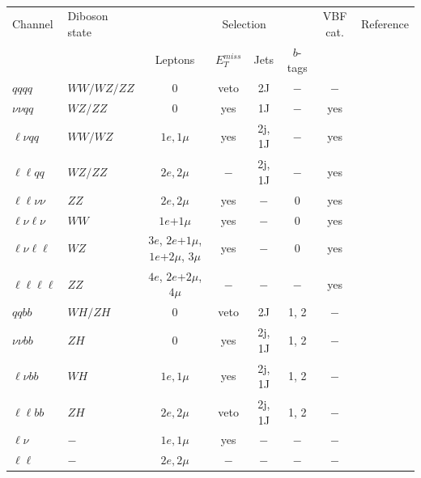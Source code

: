 \begin{table}[t]
	\caption{}
	\begin{center}
		\begin{tabular}{l l c c c c c c}
			\hline
			Channel            & Diboson state & \multicolumn{4}{c}{~~~~~~Selection}       & VBF cat. & Reference \\
			&               & Leptons       & $E^{miss}_T$  & Jets   & $b$-tags &          &           \\
			\hline
			$qq qq$            & $WW/WZ/ZZ$    & 0             & veto  & 2J     & $-$      & $-$      & \cite{EXOT-2016-19} \\
			$\nu\nu qq$        & $WZ/ZZ$       & 0             & yes   & 1J     & $-$      & yes      & \cite{EXOT-2016-29} \\
			$\ell\nu qq$       & $WW/WZ$       & $1e, 1\mu$    & yes   & 2j, 1J & $-$      & yes      & \cite{EXOT-2016-28} \\
			$\ell\ell qq$      & $WZ/ZZ$       & $2e, 2\mu$    & $-$   & 2j, 1J & $-$      & yes      & \cite{EXOT-2016-29} \\
			$\ell\ell\nu\nu$   & $ZZ$          & $2e, 2\mu$    & yes   & $-$    & 0        & yes      & \cite{HIGG-2016-19} \\
			$\ell\nu\ell\nu$   & $WW$          & $1e$+$1\mu$   & yes   & $-$    & 0        & yes      & \cite{HIGG-2016-31} \\
			$\ell\nu\ell\ell$  & $WZ$          & $3e$, $2e$+$1\mu$, $1e$+$2\mu$, $3\mu$ & yes & $-$ & 0 & yes & \cite{EXOT-2016-11} \\
			$\ell\ell\ell\ell$ & $ZZ$          & $4e$, $2e$+$2\mu$, $4\mu$ & $-$ & $-$ & $-$ & yes    & \cite{HIGG-2016-19} \\
			\hline
			$qq bb$            & $WH/ZH$       & 0             & veto  & 2J     & 1, 2     & $-$      & \cite{EXOT-2016-12} \\
			$\nu\nu bb$        & $ZH$          & 0             & yes   & 2j, 1J & 1, 2     & $-$      & \cite{EXOT-2016-10} \\
			$\ell\nu bb$       & $WH$          & $1e, 1\mu$    & yes   & 2j, 1J & 1, 2     & $-$      & \cite{EXOT-2016-10} \\
			$\ell\ell bb$      & $ZH$          & $2e, 2\mu$    & veto  & 2j, 1J & 1, 2     & $-$      & \cite{EXOT-2016-10} \\
			\hline
			$\ell\nu$          & $-$           & $1e, 1\mu$    & yes   & $-$    & $-$      & $-$      & \cite{EXOT-2016-06} \\
			$\ell\ell$         & $-$           & $2e, 2\mu$    & $-$   & $-$    & $-$      & $-$      & \cite{EXOT-2016-05} \\
			\hline
		\end{tabular}
		\label{tab:signatures}
	\end{center}
\end{table}


